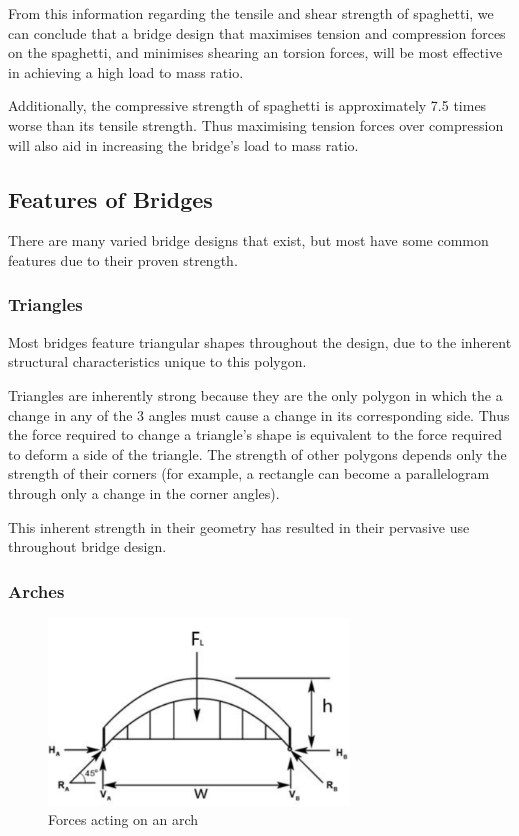 \documentclass[a4paper,11pt]{article}
\begin{document}
From this information regarding the tensile and shear strength of spaghetti, we
can conclude that a bridge design that maximises tension and compression forces
on the spaghetti, and minimises shearing an torsion forces, will be most
effective in achieving a high load to mass ratio.

Additionally, the compressive strength of spaghetti is approximately 7.5 times
worse than its tensile strength. Thus maximising tension forces over compression
will also aid in increasing the bridge's load to mass ratio.


\subsection{Features of Bridges}

There are many varied bridge designs that exist, but most have some common
features due to their proven strength.


\subsubsection{Triangles}

Most bridges feature triangular shapes throughout the design, due to the
inherent structural characteristics unique to this polygon.

Triangles are inherently strong because they are the only polygon in which the
a change in any of the 3 angles must cause a change in its corresponding side.
Thus the force required to change a triangle's shape is equivalent to the force
required to deform a side of the triangle.
The strength of other polygons depends only the strength of their corners (for
example, a rectangle can become a parallelogram through only a change in the
corner angles).

This inherent strength in their geometry has resulted in their pervasive use
throughout bridge design.


\subsubsection{Arches}

\begin{figure}
\begin{center}
\includegraphics[width=8cm]{figures/arch.png}
\end{center}
\caption{Forces acting on an arch}
\label{research:arch}
\end{figure}
\end{document}
